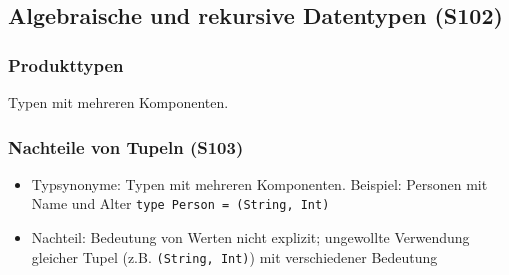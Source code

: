 \subsection{Algebraische und rekursive Datentypen (S102)}

\subsubsection{Produkttypen}
Typen mit mehreren Komponenten.

\subsubsection{Nachteile von Tupeln (S103)}
\begin{itemize}
	\item Typsynonyme: Typen mit mehreren Komponenten. Beispiel: Personen mit Name und Alter \texttt{type Person = (String, Int)}
	\item Nachteil: Bedeutung von Werten nicht explizit; ungewollte Verwendung gleicher Tupel (z.B. \texttt{(String, Int)}) mit verschiedener Bedeutung
\end{itemize}

